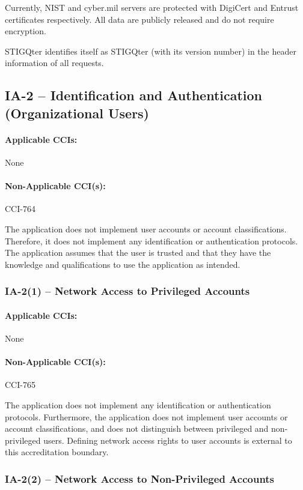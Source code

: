 \documentclass[letterpaper, 10pt, twoside]{article}
\begin{document}
Currently, NIST and cyber.mil servers are protected with DigiCert and Entrust certificates respectively. All data are publicly released and do not require encryption.

STIGQter identifies itself as STIGQter (with its version number) in the header information of all requests.

\subsection{IA-2 -- Identification and Authentication (Organizational Users)}
\label{sec:ia-2}

\paragraph{Applicable CCIs:} None

\paragraph{Non-Applicable CCI(s):} CCI-764

The application does not implement user accounts or account classifications. Therefore, it does not implement any identification or authentication protocols. The application assumes that the user is trusted and that they have the knowledge and qualifications to use the application as intended.

\subsubsection{IA-2(1) -- Network Access to Privileged Accounts}

\paragraph{Applicable CCIs:} None

\paragraph{Non-Applicable CCI(s):} CCI-765

The application does not implement any identification or authentication protocols. Furthermore, the application does not implement user accounts or account classifications, and does not distinguish between privileged and non-privileged users. Defining network access rights to user accounts is external to this accreditation boundary.

\subsubsection{IA-2(2) -- Network Access to Non-Privileged Accounts}
\end{document}
